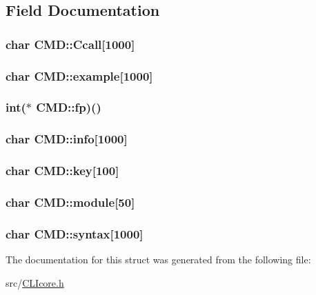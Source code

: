 \subsection{Field Documentation}
\hypertarget{structCMD_a4444ae77b67843964c412bb7f283c373}{
\subsubsection[{Ccall}]{\setlength{\rightskip}{0pt plus 5cm}char C\+M\+D\+::\+Ccall\mbox{[}1000\mbox{]}}}\label{structCMD_a4444ae77b67843964c412bb7f283c373}
\hypertarget{structCMD_ace2e43b45ffe9d3be7e053c864b2807e}{
\subsubsection[{example}]{\setlength{\rightskip}{0pt plus 5cm}char C\+M\+D\+::example\mbox{[}1000\mbox{]}}}\label{structCMD_ace2e43b45ffe9d3be7e053c864b2807e}
\hypertarget{structCMD_a975a22ae744796142cd5545b506662e5}{
\subsubsection[{fp}]{\setlength{\rightskip}{0pt plus 5cm}int($\ast$  C\+M\+D\+::fp)()}}\label{structCMD_a975a22ae744796142cd5545b506662e5}
\hypertarget{structCMD_a008f20bb66a74f15dc4e9536ca19dd9a}{
\subsubsection[{info}]{\setlength{\rightskip}{0pt plus 5cm}char C\+M\+D\+::info\mbox{[}1000\mbox{]}}}\label{structCMD_a008f20bb66a74f15dc4e9536ca19dd9a}
\hypertarget{structCMD_ab3aedae0ea688867922c5db16e0c136f}{
\subsubsection[{key}]{\setlength{\rightskip}{0pt plus 5cm}char C\+M\+D\+::key\mbox{[}100\mbox{]}}}\label{structCMD_ab3aedae0ea688867922c5db16e0c136f}
\hypertarget{structCMD_a4cdcd2100bc392217fc7b794e20a261a}{
\subsubsection[{module}]{\setlength{\rightskip}{0pt plus 5cm}char C\+M\+D\+::module\mbox{[}50\mbox{]}}}\label{structCMD_a4cdcd2100bc392217fc7b794e20a261a}
\hypertarget{structCMD_af841a2189f9e693dd3ec530d368d3e92}{
\subsubsection[{syntax}]{\setlength{\rightskip}{0pt plus 5cm}char C\+M\+D\+::syntax\mbox{[}1000\mbox{]}}}\label{structCMD_af841a2189f9e693dd3ec530d368d3e92}


The documentation for this struct was generated from the following file\+:\begin{DoxyCompactItemize}
\item 
src/\hyperlink{CLIcore_8h}{C\+L\+Icore.\+h}\end{DoxyCompactItemize}
